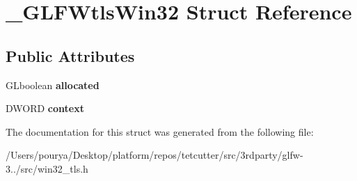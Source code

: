\hypertarget{struct__GLFWtlsWin32}{}\section{\+\_\+\+G\+L\+F\+Wtls\+Win32 Struct Reference}
\label{struct__GLFWtlsWin32}
\subsection*{Public Attributes}
\begin{DoxyCompactItemize}
\item 
\hypertarget{struct__GLFWtlsWin32_a80ff2368e83871066b62e0cfba356ba4}{}G\+Lboolean {\bfseries allocated}\label{struct__GLFWtlsWin32_a80ff2368e83871066b62e0cfba356ba4}

\item 
\hypertarget{struct__GLFWtlsWin32_a348b397df9dfe7a074e80bd94496b90c}{}D\+W\+O\+R\+D {\bfseries context}\label{struct__GLFWtlsWin32_a348b397df9dfe7a074e80bd94496b90c}

\end{DoxyCompactItemize}


The documentation for this struct was generated from the following file\+:\begin{DoxyCompactItemize}
\item 
/\+Users/pourya/\+Desktop/platform/repos/tetcutter/src/3rdparty/glfw-\/3../src/win32\+\_\+tls.\+h\end{DoxyCompactItemize}

